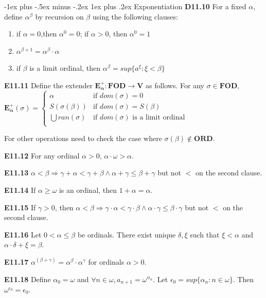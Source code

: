 \documentclass[10pt, landscape]{article}
\makeatletter
\renewcommand{\subsection}{\@startsection{subsection}{3}{0mm}%
                                {-1ex plus -.5ex minus -.2ex}%
                                {1ex plus .2ex}%
                                {\normalfont\small\bfseries}}%
\makeatother
\begin{document}
\begin{multicols*}{3}
\subsection{Exponentiation}
\textbf{D11.10} For a fixed $\alpha$, define $\alpha^\beta$ by recursion on $\beta$ using the following clauses:
\begin{enumerate}
    \item if $\alpha=0$,then $\alpha^0=0$; if $\alpha>0$, then $\alpha^0=1$
    \item $\alpha^{\beta+1}=\alpha^\beta\cdot\alpha$
    \item if $\beta$ is a limit ordinal, then $\alpha^\beta=sup\{a^\xi:\xi<\beta\}$
\end{enumerate}

\textbf{E11.11} Define the extender $\mathbf{E_\alpha^+:FOD\rightarrow V}$ as follows. For any $\sigma \in \mathbf{FOD}$, $\mathbf{E_\alpha^+}(\sigma) =
    \left\{
    \begin{array}{lr}
      \alpha & \text{if $dom(\sigma)=0$} \\
      S(\sigma(\beta)) & \text{if $dom(\sigma) =S(\beta)$} \\
      \bigcup ran(\sigma) & \text{if $dom(\sigma)$ is a limit ordinal} \\
    \end{array}
    \right.
    $
    
For other operations need to check the case where $\sigma(\beta)\notin\mathbf{ORD}$.

\textbf{E11.12} For any ordinal $\alpha>0$, $\alpha \cdot \omega > \alpha$.

\textbf{E11.13} $\alpha < \beta \Rightarrow \gamma + \alpha < \gamma +\beta \land \alpha + \gamma \leq \beta +\gamma$ but not $<$ on the second clause.

\textbf{E11.14} If $\alpha \geq \omega$ is an ordinal, then $1+\alpha=\alpha$.

\textbf{E11.15} If $\gamma > 0$, then $\alpha < \beta \Rightarrow \gamma \cdot \alpha < \gamma \cdot \beta \land \alpha \cdot \gamma \leq \beta \cdot \gamma$ but not $<$ on the second clause.

\textbf{E11.16} Let $0<\alpha\leq \beta$ be ordinals. There exist unique $\delta, \xi$ such that $\xi < \alpha$ and $\alpha\cdot\delta+\xi=\beta$.

\textbf{E11.17} $\alpha^{(\beta+\gamma)}=\alpha^\beta\cdot\alpha^\gamma$ for ordinals $\alpha>0$.

\textbf{E11.18} Define $\alpha_0=\omega$ and $\forall n \in \omega, a_{n+1}=\omega^{\alpha_n}$. Let $\epsilon_0=sup\{\alpha_n:n\in\omega\}$. Then $\omega^{\epsilon_0}=\epsilon_0$.


\end{multicols*}
\end{document}
